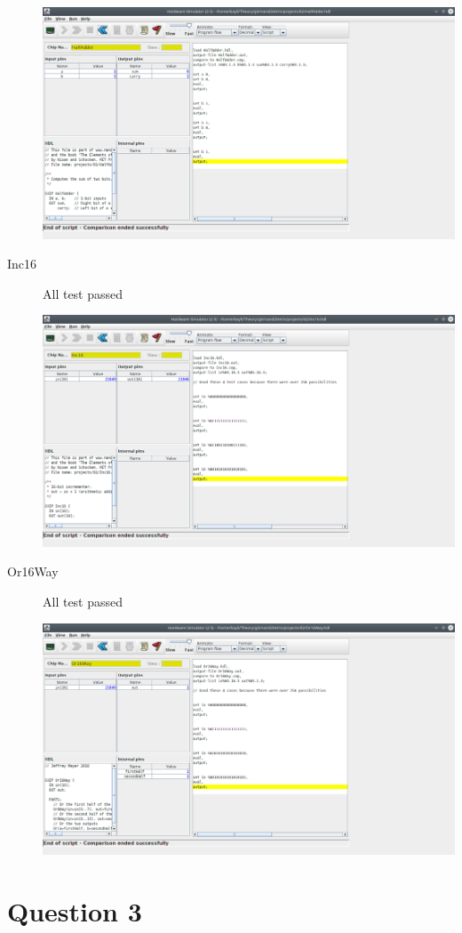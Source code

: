 \documentclass[titlepage]{article}
\begin{document}
\begin{description}
{    \includegraphics[width=.9\textwidth]{02/HalfAdder.png}
  }
  \item[Inc16]{
    All test passed

    \includegraphics[width=.9\textwidth]{02/Inc16.png}
  }
  \item[Or16Way]{
    All test passed

    \includegraphics[width=.9\textwidth]{02/Or16Way.png}
  }
\end{description}

\section{Question 3}
\end{document}
